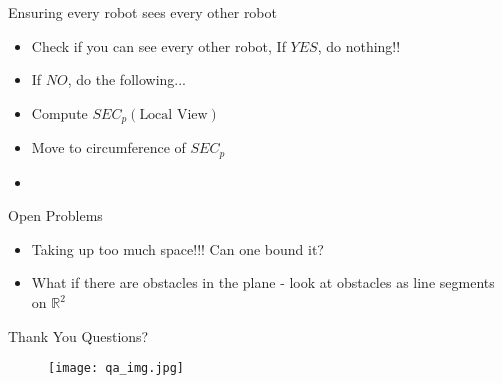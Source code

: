 \documentclass{beamer}
\begin{document}
\begin{frame}{Ensuring every robot sees every other robot}
\begin{itemize}
\item Check if you can see every other robot, If $YES$, do nothing!! 
\pause
\item If $NO$, do the following...
\item Compute $SEC_p(\text{Local View})$
\item Move to circumference of $SEC_p$
\item
\end{itemize}
\end{frame}
\begin{frame}{Open Problems}
\begin{itemize}
\item Taking up too much space!!! Can one bound it? 
\pause
\item What if there are obstacles in the plane - look at obstacles as line segments on $\mathbb{R}^2$
\end{itemize}
\end{frame}

\begin{frame}{Thank You}
Questions?
\begin{figure}[ht!]
\centering
\texttt{[image: qa\_img.jpg]}
\end{figure}
\end{frame}
\end{document}
